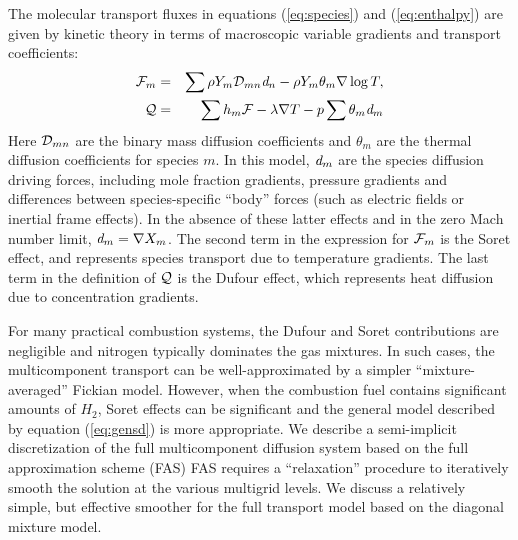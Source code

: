 \documentclass[11pt]{article}
\begin{document}
The molecular transport fluxes in equations (\ref{eq:species}) and
(\ref{eq:enthalpy}) are given by kinetic theory in terms of
macroscopic variable gradients and transport coefficients:
\begin{eqnarray}
{\cal F}_{m} &=& \sum \rho Y_{m} {\cal D}_{mn} {\bf {\it d}}_{n} - \rho Y_{m}\theta_{m} \nabla \log T, \nonumber \\
{\cal Q} &=& \sum h_{m} {\cal F} - \lambda \nabla T - p \sum \theta_{m} {\bf {\it d}}_{m}
\label{eq:gensd}
\end{eqnarray}
Here ${\cal D}_{mn}$ are the binary mass diffusion coefficients and
$\theta_{m}$ are the thermal diffusion coefficients for species $m$.
In this model, ${\bf {\it d}}_{m}$ are the species diffusion driving
forces, including mole fraction gradients, pressure gradients and
differences between species-specific ``body'' forces (such as electric
fields or inertial frame effects).  In the absence of these latter
effects and in the zero Mach number limit, ${\bf {\it d}}_{m} = \nabla
X_{m}$.  The second term in the expression for ${\cal F}_{m}$ is the
Soret effect, and represents species transport due to temperature
gradients.  The last term in the definition of $\cal Q$ is the Dufour
effect, which represents heat diffusion due to concentration
gradients.%

For many practical combustion systems, the Dufour and Soret
contributions are negligible and nitrogen typically dominates the gas
mixtures.  In such cases, the multicomponent transport can be
well-approximated by a simpler ``mixture-averaged'' Fickian model.
However, when the combustion fuel contains significant amounts of
$H_2$, Soret effects can be significant
and the general model described by
equation (\ref{eq:gensd}) is more appropriate.  We describe a
semi-implicit discretization of the full multicomponent diffusion
system based on the full approximation scheme (FAS) 
FAS requires a ``relaxation''
procedure to iteratively smooth the solution at the various multigrid
levels.  We discuss a relatively simple, but effective smoother
for the full transport model based on the diagonal mixture model.
\end{document}
